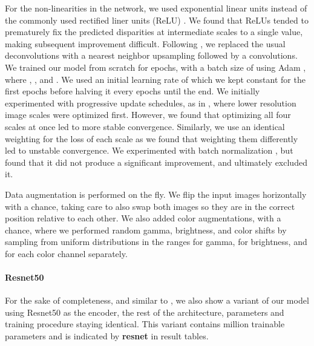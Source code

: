 \documentclass[10pt,twocolumn,letterpaper]{article}
\begin{document}
For the non-linearities in the network, we used exponential linear units \cite{elus} instead of the commonly used rectified liner units (ReLU) \cite{nair2010rectified}. 
We found that ReLUs tended to prematurely fix the predicted disparities at intermediate scales to a single value, making subsequent improvement difficult. Following \cite{odena2016deconvolution}, we replaced the usual deconvolutions with a nearest neighbor upsampling followed by a convolutions.
We trained our model from scratch for  epochs, with a batch size of  using Adam \cite{adamsolver}, where , , and . 
We used an initial learning rate of  which we kept constant for the first  epochs before halving it every  epochs until the end.
We initially experimented with progressive update schedules, as in \cite{mayer2015large}, where lower resolution image scales were optimized first.
However, we found that optimizing all four scales at once led to more stable convergence.
Similarly, we use an identical weighting for the loss of each scale as we found that weighting them differently led to unstable convergence.
We experimented with batch normalization \cite{ioffe2015batch}, but found that it did not produce a significant improvement, and ultimately excluded it.

Data augmentation is performed on the fly. We flip the input images horizontally with a  chance, taking care to also swap both images so they are in the correct position relative to each other.
We also added color augmentations, with a  chance, where we performed random gamma, brightness, and color shifts by sampling from uniform distributions in the ranges  for gamma,  for brightness, and  for each color channel separately.

\paragraph{Resnet50} For the sake of completeness, and similar to \cite{laina2016deeper}, we also show a variant of our model using Resnet50 \cite{he2016deep} as the encoder, the rest of the architecture, parameters and training procedure staying identical. This variant contains  million trainable parameters and is indicated by \textbf{resnet} in result tables.
\end{document}
